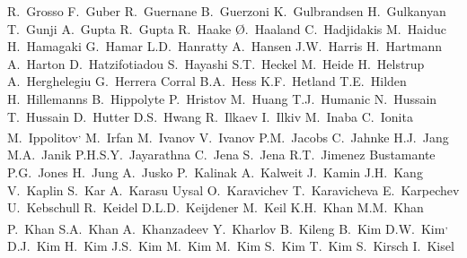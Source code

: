 \begin{flushleft}
R.~Grosso\And
F.~Guber\And
R.~Guernane\And
B.~Guerzoni\And
K.~Gulbrandsen\And
H.~Gulkanyan\And
T.~Gunji\And
A.~Gupta\And
R.~Gupta\And
R.~Haake\And
{\O}.~Haaland\And
C.~Hadjidakis\And
M.~Haiduc\And
H.~Hamagaki\And
G.~Hamar\And
L.D.~Hanratty\And
A.~Hansen\And
J.W.~Harris\And
H.~Hartmann\And
A.~Harton\And
D.~Hatzifotiadou\And
S.~Hayashi\And
S.T.~Heckel\And
M.~Heide\And
H.~Helstrup\And
A.~Herghelegiu\And
G.~Herrera Corral\And
B.A.~Hess\And
K.F.~Hetland\And
T.E.~Hilden\And
H.~Hillemanns\And
B.~Hippolyte\And
P.~Hristov\And
M.~Huang\And
T.J.~Humanic\And
N.~Hussain\And
T.~Hussain\And
D.~Hutter\And
D.S.~Hwang\And
R.~Ilkaev\And
I.~Ilkiv\And
M.~Inaba\And
C.~Ionita\And
M.~Ippolitov\textsuperscript{,}\And
M.~Irfan\And
M.~Ivanov\And
V.~Ivanov\And
P.M.~Jacobs\And
C.~Jahnke\And
H.J.~Jang\And
M.A.~Janik\And
P.H.S.Y.~Jayarathna\And
C.~Jena\And
S.~Jena\And
R.T.~Jimenez Bustamante\And
P.G.~Jones\And
H.~Jung\And
A.~Jusko\And
P.~Kalinak\And
A.~Kalweit\And
J.~Kamin\And
J.H.~Kang\And
V.~Kaplin\And
S.~Kar\And
A.~Karasu Uysal\And
O.~Karavichev\And
T.~Karavicheva\And
E.~Karpechev\And
U.~Kebschull\And
R.~Keidel\And
D.L.D.~Keijdener\And
M.~Keil\And
K.H.~Khan\And
M.M.~Khan\And
P.~Khan\And
S.A.~Khan\And
A.~Khanzadeev\And
Y.~Kharlov\And
B.~Kileng\And
B.~Kim\And
D.W.~Kim\textsuperscript{,}\And
D.J.~Kim\And
H.~Kim\And
J.S.~Kim\And
M.~Kim\And
M.~Kim\And
S.~Kim\And
T.~Kim\And
S.~Kirsch\And
I.~Kisel\And

\end{flushleft}

